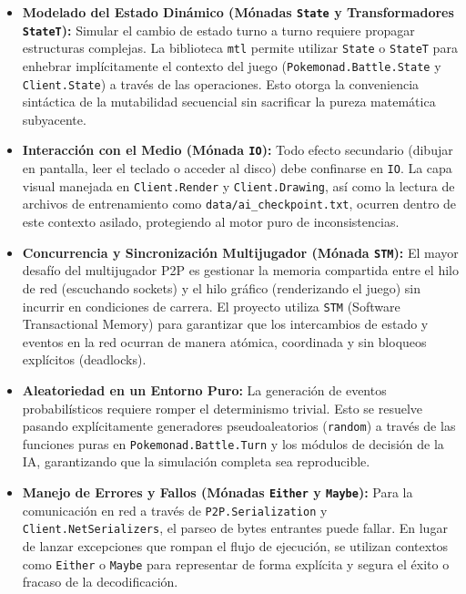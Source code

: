 \begin{itemize}
    \item \textbf{Modelado del Estado Dinámico (Mónadas \texttt{State} y Transformadores \texttt{StateT}):} Simular el cambio de estado turno a turno requiere propagar estructuras complejas. La biblioteca \texttt{mtl} \cite{mtl_docs} permite utilizar \texttt{State} o \texttt{StateT} para enhebrar implícitamente el contexto del juego (\texttt{Pokemonad.Battle.State} y \texttt{Client.State}) a través de las operaciones. Esto otorga la conveniencia sintáctica de la mutabilidad secuencial sin sacrificar la pureza matemática subyacente.
    \item \textbf{Interacción con el Medio (Mónada \texttt{IO}):} Todo efecto secundario (dibujar en pantalla, leer el teclado o acceder al disco) debe confinarse en \texttt{IO}. La capa visual manejada en \texttt{Client.Render} y \texttt{Client.Drawing}, así como la lectura de archivos de entrenamiento como \texttt{data/ai\_checkpoint.txt}, ocurren dentro de este contexto asilado, protegiendo al motor puro de inconsistencias.
    \item \textbf{Concurrencia y Sincronización Multijugador (Mónada \texttt{STM}):} El mayor desafío del multijugador P2P es gestionar la memoria compartida entre el hilo de red (escuchando sockets) y el hilo gráfico (renderizando el juego) sin incurrir en condiciones de carrera. El proyecto utiliza \texttt{STM} (Software Transactional Memory) \cite{peytonjones2007} para garantizar que los intercambios de estado y eventos en la red ocurran de manera atómica, coordinada y sin bloqueos explícitos (deadlocks).
    \item \textbf{Aleatoriedad en un Entorno Puro:} La generación de eventos probabilísticos requiere romper el determinismo trivial. Esto se resuelve pasando explícitamente generadores pseudoaleatorios (\texttt{random}) a través de las funciones puras en \texttt{Pokemonad.Battle.Turn} y los módulos de decisión de la IA, garantizando que la simulación completa sea reproducible.
    \item \textbf{Manejo de Errores y Fallos (Mónadas \texttt{Either} y \texttt{Maybe}):} Para la comunicación en red a través de \texttt{P2P.Serialization} y \texttt{Client.NetSerializers}, el parseo de bytes entrantes puede fallar. En lugar de lanzar excepciones que rompan el flujo de ejecución, se utilizan contextos como \texttt{Either} o \texttt{Maybe} para representar de forma explícita y segura el éxito o fracaso de la decodificación.
\end{itemize}

